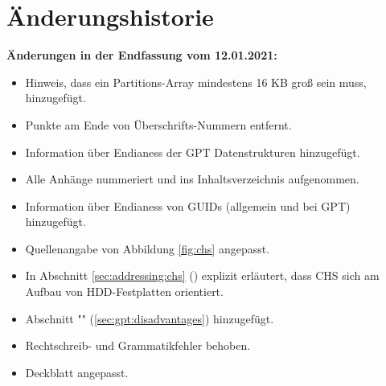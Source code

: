 \section{Änderungshistorie}

\textbf{Änderungen in der Endfassung vom 12.01.2021:}

\begin{itemize}
    \item Hinweis, dass ein Partitions-Array mindestens 16 KB groß sein muss, hinzugefügt.

    \item Punkte am Ende von Überschrifts-Nummern entfernt.

    \item Information über Endianess der GPT Datenstrukturen hinzugefügt.
    
    \item Alle Anhänge nummeriert und ins Inhaltsverzeichnis aufgenommen.
    
    \item Information über Endianess von GUIDs (allgemein und bei GPT) hinzugefügt.
    
    \item Quellenangabe von Abbildung \ref{fig:chs} angepasst.
    
    \item In Abschnitt \ref{sec:addressing:chs} () explizit erläutert, dass CHS sich am Aufbau von HDD-Festplatten orientiert.
    
    \item Abschnitt "" (\ref{sec:gpt:disadvantages}) hinzugefügt.
    
    \item Rechtschreib- und Grammatikfehler behoben.
    
    \item Deckblatt angepasst.
\end{itemize}
